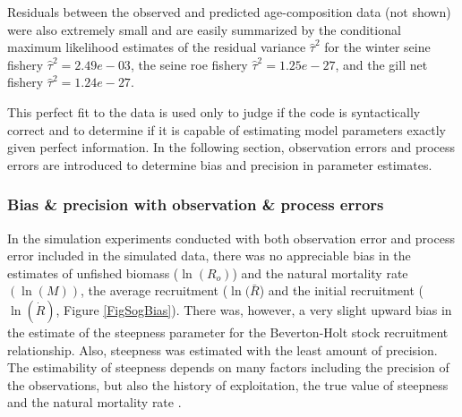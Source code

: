 Residuals between the observed and predicted age-composition data (not shown) were also extremely small and are easily summarized by the conditional maximum likelihood estimates of the residual variance 	$\widehat{\tau}^2$ for the winter seine fishery $\widehat{\tau}^2=2.49e-03$, the seine roe fishery $\widehat{\tau}^2=1.25e-27$, and the gill net fishery  $\widehat{\tau}^2=1.24e-27$.  

This perfect fit to the data is used only to judge if the code is syntactically correct and to determine if it is capable of estimating model parameters exactly given perfect information.  In the following section, observation errors and process errors are introduced to determine bias and precision in parameter estimates.
		
		\subsubsection{Bias \& precision with observation \& process errors}

In the simulation experiments conducted with both observation error and process error included in the simulated data, there was no appreciable bias in the estimates of unfished biomass ($\ln(R_o)$) and the natural mortality rate $(\ln(M))$,  the average recruitment ($\ln(\bar{R}$) and the initial recruitment ($\ln(\dot{R})$, Figure \ref{FigSogBias}).   There was, however, a very slight upward bias in the estimate of the steepness parameter for the Beverton-Holt stock recruitment relationship.  Also, steepness was estimated with the least amount of precision.  The estimability of steepness depends on many factors including the precision of the observations, but also the history of exploitation, the true value of steepness and the natural mortality rate \citep{conn2010can}.
		
